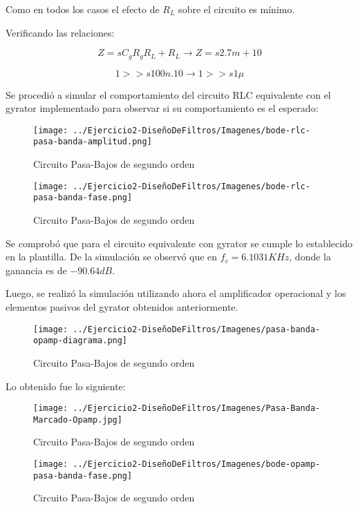 Como en todos los casos el efecto de $R_L$ sobre el circuito es mínimo.

Verificando las relaciones:

$$Z=sC_gR_gR_L+R_L \longrightarrow Z = s2.7m + 10$$

$$1 >> s100n.10 \longrightarrow 1  >> s1\mu$$

Se procedió a simular el comportamiento del circuito RLC equivalente con el gyrator implementado para observar si su comportamiento es el esperado:


\begin{figure}[H]
    \centering
    \texttt{[image: ../Ejercicio2-DiseñoDeFiltros/Imagenes/bode-rlc-pasa-banda-amplitud.png]}
    \caption{Circuito Pasa-Bajos de segundo orden}
\end{figure}

\begin{figure}[H]
    \centering
    \texttt{[image: ../Ejercicio2-DiseñoDeFiltros/Imagenes/bode-rlc-pasa-banda-fase.png]}
    \caption{Circuito Pasa-Bajos de segundo orden}
\end{figure}

Se comprobó que para el circuito equivalente con gyrator se cumple lo establecido en la plantilla.
De la simulación se observó que en $f_c=6.1031 KHz$, donde la ganancia es de $-90.64 dB$.

Luego, se realizó la simulación utilizando ahora el amplificador operacional y los elementos pasivos del gyrator obtenidos anteriormente.

\begin{figure}[H]
    \centering
    \texttt{[image: ../Ejercicio2-DiseñoDeFiltros/Imagenes/pasa-banda-opamp-diagrama.png]}
    \caption{Circuito Pasa-Bajos de segundo orden}
\end{figure}

Lo obtenido fue lo siguiente:

\begin{figure}[H]
    \centering
    \texttt{[image: ../Ejercicio2-DiseñoDeFiltros/Imagenes/Pasa-Banda-Marcado-Opamp.jpg]}
    \caption{Circuito Pasa-Bajos de segundo orden}
\end{figure}

\begin{figure}[H]
    \centering
    \texttt{[image: ../Ejercicio2-DiseñoDeFiltros/Imagenes/bode-opamp-pasa-banda-fase.png]}
    \caption{Circuito Pasa-Bajos de segundo orden}
\end{figure}

